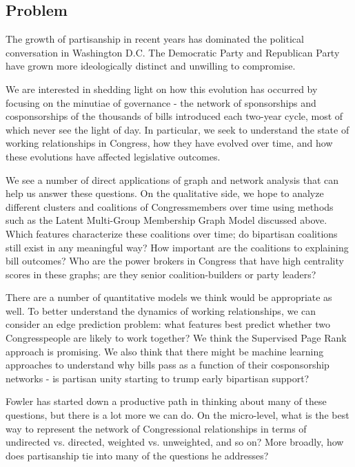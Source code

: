 \subsection{Problem}

The growth of partisanship in recent years has dominated the political conversation in Washington D.C. The Democratic Party and Republican Party have grown more ideologically distinct and unwilling to compromise. 

We are interested in shedding light on how this evolution has occurred by focusing on the minutiae of governance - the network of sponsorships and cosponsorships of the thousands of bills introduced each two-year cycle, most of which never see the light of day. In particular, we seek to understand the state of working relationships in Congress, how they have evolved over time, and how these evolutions have affected legislative outcomes.

We see a number of direct applications of graph and network analysis that can help us answer these questions. On the qualitative side, we hope to analyze different clusters and coalitions of Congressmembers over time using methods such as the Latent Multi-Group Membership Graph Model discussed above. Which features characterize these coalitions over time; do bipartisan coalitions still exist in any meaningful way? How important are the coalitions to explaining bill outcomes? Who are the power brokers in Congress that have high centrality scores in these graphs; are they senior coalition-builders or party leaders?

There are a number of quantitative models we think would be appropriate as well. To better understand the dynamics of working relationships, we can consider an edge prediction problem: what features best predict whether two Congresspeople are likely to work together? We think the Supervised Page Rank approach is promising. We also think that there might be machine learning approaches to understand why bills pass as a function of their cosponsorship networks - is partisan unity starting to trump early bipartisan support?

Fowler has started down a productive path in thinking about many of these questions, but there is a lot more we can do. On the micro-level, what is the best way to represent the network of Congressional relationships in terms of undirected vs. directed, weighted vs. unweighted, and so on? More broadly, how does partisanship tie into many of the questions he addresses?
